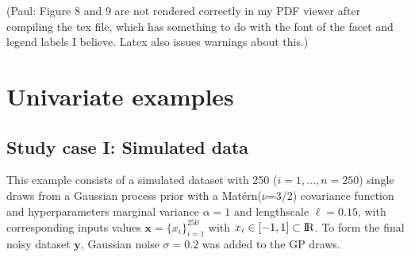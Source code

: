 \documentclass[]{interact}
\theoremstyle{plain}%
\theoremstyle{definition}
\theoremstyle{remark}
\begin{document}
(Paul: Figure 8 and 9 are not rendered correctly in my PDF viewer after 
compiling the tex file, which has something to do with the font of the facet 
and legend labels I believe. Latex also issues warnings about this.)




\section{Univariate examples}


\subsection{Study case I: Simulated data}

This example consists of a simulated dataset with 250 ($i=1,\dots,n=250$) single draws from a Gaussian process prior with a Mat{\'e}rn($\nu$=3/2) covariance function and hyperparameters marginal variance $\alpha=1$ and lengthscale $\ell=0.15$, with corresponding inputs values $\bm{x}=\{x_i\}_{i=1}^{250}$ with $x_i \in [-1,1] \subset {\rm I\!R}$. To form the final noisy dataset $\bm{y}$, Gaussian noise $\sigma=0.2$ was added to the GP draws.
\end{document}
